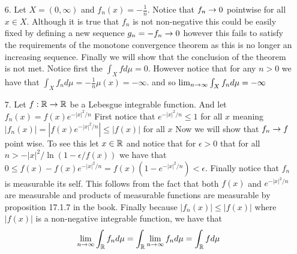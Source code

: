 \documentclass[12pt]{amsart}
\begin{document}
\begin{itemize}
\begin{itemize}
    \end{itemize}

    \item[6.] Let $X=(0,\infty)$ and $f_n(x)=-\frac{1}{n}$. Notice that $f_n\rightarrow 0$ pointwise for all $x\in X$. 
    Although it is true that $f_n$ is not non-negative this could be easily fixed by defining a new 
    sequence $g_n=-f_n\rightarrow 0$ however this fails to satisfy the requirements of the monotone convergence theorem
    as this is no longer an increasing sequence. Finally we will show that the conclusion of the theorem is not met.
    Notice first the $\int_X f d\mu = 0$. However notice that for any $n>0$ we have that 
    $\int_X f_n d\mu = -\frac{1}{n}\mu(x)=-\infty$. and so $\lim_{n\rightarrow \infty}\int_X f_n d\mu =-\infty$


    \item[7.] Let $f:\mathbb{R}\rightarrow\mathbb{R}$ be a Lebesgue integrable function. And let $f_n(x)=f(x)e^{-|x|^2/n}$
              First notice that $e^{-|x|^2/n}\leq 1$ for all $x$ meaning 
              $|f_n(x)|=|f(x)e^{-|x|^2/n}|\leq |f(x)|$ for all $x$
              Now we will show that $f_n\rightarrow f$ point wise. To see this let $x\in \mathbb{R}$ and notice
              that for $\epsilon>0$ that for all $n>-|x|^2/\ln(1-\epsilon/f(x))$ we have that 
              $0\leq f(x)-f(x)e^{-|x|^2/n}=f(x)(1-e^{-|x|^2/n})<\epsilon$.
              Finally notice that $f_n$ is measurable its self. This follows from the fact that both
              $f(x)$ and $e^{-|x|^2/n}$ are measurable and products of measurable functions are measurable
              by proposition 17.1.7 in the book.
              Finally because $|f_n(x)|\leq |f(x)|$ where $|f(x)|$ is a non-negative integrable function, we have that
              \[\lim_{n\rightarrow \infty}\int_{\mathbb{R}} f_nd\mu = \int_{\mathbb{R}} \lim_{n\rightarrow \infty}f_nd\mu = \int_{\mathbb{R}} f d\mu\]
\end{itemize}

\end{document}
